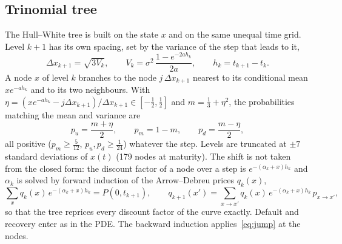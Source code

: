 \documentclass[11pt,a4paper]{article}
\begin{document}
\subsection{Trinomial tree}
The Hull--White tree \cite{hull1994} is built on the state $x$ and on the same unequal time grid. Level $k+1$ has its
own spacing, set by the variance of the step that leads to it,
\begin{equation}
\Delta x_{k+1} = \sqrt{3V_k}, \qquad V_k = \sigma^2\,\frac{1 - e^{-2ah_k}}{2a}, \qquad h_k = t_{k+1} - t_k.
\end{equation}
A node $x$ of level $k$ branches to the node $j\,\Delta x_{k+1}$ nearest to its conditional mean $x e^{-ah_k}$ and
to its two neighbours. With $\eta = (xe^{-ah_k} - j\Delta x_{k+1})/\Delta x_{k+1} \in [-\frac12, \frac12]$ and
$m = \frac13 + \eta^2$, the probabilities matching the mean and variance are
\begin{equation}
p_u = \frac{m + \eta}{2}, \qquad p_m = 1 - m, \qquad p_d = \frac{m - \eta}{2},
\end{equation}
all positive ($p_m \ge \frac{5}{12}$, $p_u, p_d \ge \frac{1}{24}$) whatever the step. Levels are truncated at
$\pm 7$ standard deviations of $x(t)$ (179 nodes at maturity). The shift is not taken from the closed form: the
discount factor of a node over a step is $e^{-(\alpha_k + x)h_k}$ and $\alpha_k$ is solved by forward induction of
the Arrow--Debreu prices $q_{k}(x)$,
\begin{equation}
\sum_{x} q_k(x)\,e^{-(\alpha_k + x)h_k} = P(0, t_{k+1}), \qquad
q_{k+1}(x') = \sum_{x \to x'} q_k(x)\,e^{-(\alpha_k + x)h_k}\,p_{x \to x'},
\end{equation}
so that the tree reprices every discount factor of the curve exactly. Default and recovery enter as in the PDE. The
backward induction applies~\eqref{eq:jump} at the nodes.
\end{document}
